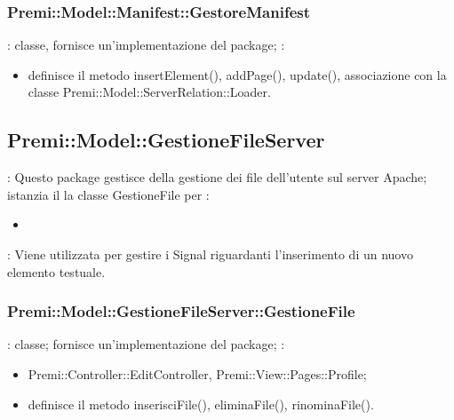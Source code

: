 	\subsubsection{Premi::Model::Manifest::GestoreManifest}{
		\textbf{\tipo}: classe, fornisce un'implementazione del package;
		\textbf{\relaz}:
		\begin{itemize}
			\item definisce il metodo insertElement(), addPage(), update(), associazione con la classe Premi::Model::ServerRelation::Loader.
		\end{itemize}
        }

\subsection{Premi::Model::GestioneFileServer} {
   	\textbf{\tipo}: Questo package gestisce della gestione dei file dell'utente sul server Apache; istanzia il la classe GestioneFile per 
   	\textbf{\relaz}:
   	\begin{itemize}
   		\item 
   	\end{itemize}
   	\textbf{\interfacce}: Viene utilizzata per gestire i Signal riguardanti l’inserimento di un nuovo elemento testuale.\\
	}
	\subsubsection{Premi::Model::GestioneFileServer::GestioneFile}{
		\textbf{\tipo}: classe; fornisce un'implementazione del package;
		\textbf{\relaz}:
		\begin{itemize}
			\item Premi::Controller::EditController, Premi::View::Pages::Profile;
			\item definisce il metodo inserisciFile(), eliminaFile(), rinominaFile().
		\end{itemize}
	}

	